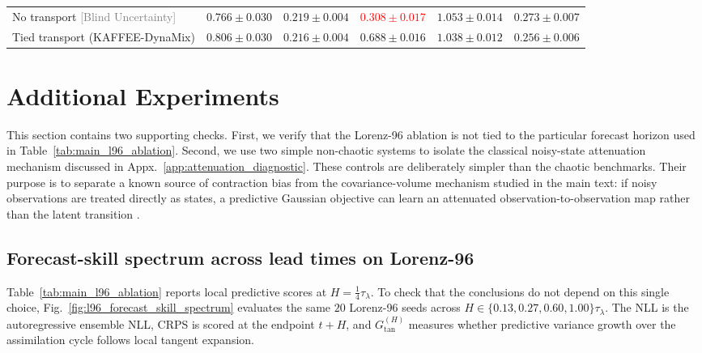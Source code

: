 \documentclass{article}
\theoremstyle{plain}
\theoremstyle{definition}
\theoremstyle{remark}
\begin{document}
\begin{table}[t]
{\begin{tabular}{@{}l cc c cc@{}}
\hspace{1em}No transport \textcolor{gray}{\scriptsize [Blind Uncertainty]} & {\bfseries\boldmath $0.766{\pm}0.030$} & {\bfseries\boldmath $0.219{\pm}0.004$} & \textcolor{red}{$0.308{\pm}0.017$} & $1.053{\pm}0.014$ & $0.273{\pm}0.007$ \\
\hspace{1em}Tied transport (KAFFEE-DynaMix) & {\bfseries\boldmath $0.806{\pm}0.030$} & {\bfseries\boldmath $0.216{\pm}0.004$} & {\bfseries\boldmath $0.688{\pm}0.016$} & {\bfseries\boldmath$1.038{\pm}0.012$} & {\bfseries\boldmath$0.256{\pm}0.006$}\\
\bottomrule
\end{tabular}
}
\label{tab:dynamix_results_table}
\end{table}

\section{Additional Experiments}
\label{sec:appendix_additional_experiments}

This section contains two supporting checks. First, we verify that the Lorenz-96 ablation is not tied to the particular forecast horizon used in Table~\ref{tab:main_l96_ablation}. Second, we use two simple non-chaotic systems to isolate the classical noisy-state attenuation mechanism discussed in Appx.~\ref{app:attenuation_diagnostic}. These controls are deliberately simpler than the chaotic benchmarks. Their purpose is to separate a known source of contraction bias from the covariance-volume mechanism studied in the main text: if noisy observations are treated directly as states, a predictive Gaussian objective can learn an attenuated observation-to-observation map rather than the latent transition \citep{fuller1987measurement,staudenmayer2005measurement}.

\subsection{Forecast-skill spectrum across lead times on Lorenz-96}
\label{app:forecast_skill_spectrum}

Table~\ref{tab:main_l96_ablation} reports local predictive scores at $H=\tfrac14\tau_\lambda$. To check that the conclusions do not depend on this single choice, Fig.~\ref{fig:l96_forecast_skill_spectrum} evaluates the same
$20$ Lorenz-96 seeds across $H\in\{0.13,0.27,0.60,1.00\}\tau_\lambda$. The NLL is the autoregressive ensemble NLL, CRPS is scored at the endpoint $t+H$, and $G_{\mathrm{tan}}^{(H)}$ measures whether predictive variance growth over the assimilation cycle follows local tangent expansion.
\end{document}
